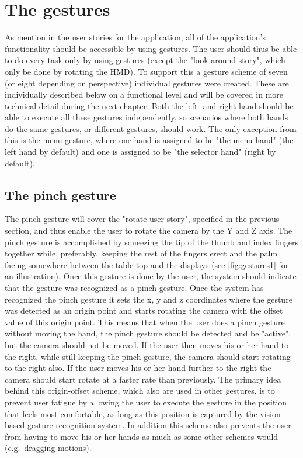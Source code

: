\section{The gestures}
As mention in the user stories for the application, all of the application's functionality should be accessible by using gestures. The user should thus
be able to do every task only by using gestures (except the "look around story", which only be done by rotating the HMD). To support this a gesture scheme of seven (or eight depending
on perspective) individual gestures were created. 
These are individually described below on a functional level and will be covered in more technical detail during the next chapter. 
Both the left- and right hand should be able to execute all these gestures independently, so scenarios where both hands do the same gestures, or different gestures, should
work. The only exception from this is the menu gesture, where one hand is assigned to be "the menu hand" (the left hand by default) and one is assigned to be "the selector hand"
(right by default).

 
\subsection{The pinch gesture}
The pinch gesture will cover the "rotate user story", specified in the previous section, and thus enable the user to rotate the camera by the Y and Z axis. 
The pinch gesture is accomplished by squeezing the tip of the thumb and index fingers together while, preferably, keeping the rest of the fingers erect and the palm facing 
somewhere between the table top and the displays (see \ref{fig:gestures1} for an illustration). Once this gesture is done by the user, 
the system should indicate that the gesture was recognized as a pinch gesture.
Once the system has recognized the pinch gesture it sets the x, y and z coordinates where the gesture was detected as an origin point and starts rotating the 
camera with the offset value of this origin point. This means that when the user does a pinch gesture without moving the hand, the pinch gesture should be detected and be
"active", but the camera should not be moved. If the user then moves his or her hand to the right, while still keeping the pinch gesture, the camera should start rotating 
to the right also. If the user moves his or her hand further to the right the camera should start rotate at a faster rate than previously.  
The primary idea behind this origin-offset scheme, which also are used in other gestures, is to prevent user fatigue by allowing the user to execute
the gesture in the position that feels most comfortable, as long as this position is captured by the vision-based gesture recognition system. 
In addition this scheme also prevents the user from having to move his or her hands as much as some other schemes would (e.g.~dragging motions).  

